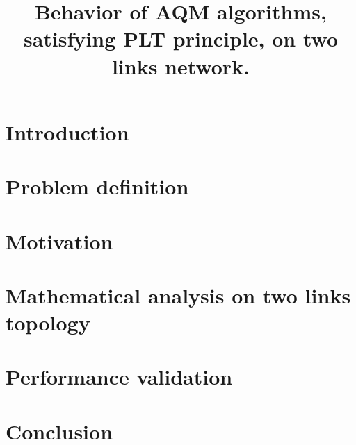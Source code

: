 \documentclass{sig-alternate}
\title{Behavior of AQM algorithms, satisfying PLT principle, on two links network.}
\begin{document}
\maketitle
\section{Introduction}

\section{Problem definition}

\section{Motivation}

\section{Mathematical analysis on two links topology}

\section{Performance validation}

\section{Conclusion}



\end{document}
